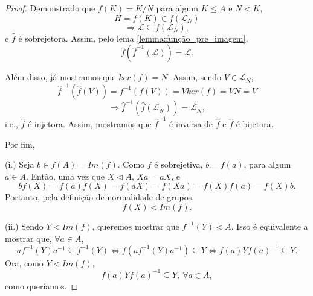 \documentclass[11pt,openany]{book}
\begin{document}
\begin{proof}
         Demonstrado que $f(K) = K/N$ para algum $K \leq A$ e $N \triangleleft K$,
         \[H = f(K) \in f(\mathcal{L}_N)\]
         \[\Rightarrow \mathcal{L} \subseteq f(\mathcal{L}_N),\]
         e $\hat{f}$ é sobrejetora. Assim, pelo lema \ref{lemma:função_pre_imagem}, 
         \[\hat{f}(\hat{f}^{-1}(\mathcal{L})) = \mathcal{L}.\]
         
         Além disso, já mostramos que $ker(f) = N$.
         Assim, sendo $V \in \mathcal{L}_N$,
         \[\hat{f}^{-1}(\hat{f}(V)) = f^{-1}(f(V)) = V ker(f) = V N = V\]
         \[\Rightarrow \hat{f}^{-1}(\hat{f}(\mathcal{L}_N)) = \mathcal{L}_N,\]
         i.e., $\hat{f}$ é injetora.
         Assim, mostramos que $\hat{f}^{-1}$ é inversa de $\hat{f}$ e $\hat{f}$ é bijetora.

         Por fim,
         

         (i.) Seja $b \in f(A) = Im(f)$. Como $f$ é sobrejetiva, $b=f(a)$, para algum $a \in A$. Então, uma vez que $X \triangleleft A$, $Xa = aX$, e
         \[bf(X) = f(a)f(X) = f(aX) = f(Xa) = f(X)f(a) = f(X)b.\]
         Portanto, pela definição de normalidade de grupos,
         \[f(X) \triangleleft Im(f).\]


         (ii.) Sendo $Y \triangleleft Im(f)$, queremos mostrar que $f^{-1}(Y) \triangleleft A$. Isso é equivalente a mostrar que, $\forall a \in A$,
         \[af^{-1}(Y)a^{-1} \subseteq f^{-1}(Y) \Leftrightarrow f(af^{-1}(Y)a^{-1}) \subseteq Y \Leftrightarrow f(a)Yf(a)^{-1} \subseteq Y.\]
         Ora, como $Y \triangleleft Im(f)$, 
         \[f(a)Yf(a)^{-1} \subseteq Y, \ \forall a \in A,\]
         como queríamos.
     \end{proof}
\end{document}
